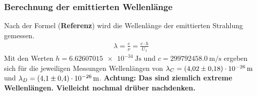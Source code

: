 \subsubsection{Berechnung der emittierten Wellenlänge}
Nach der Formel (\textbf{Referenz}) wird die Wellenlänge der emittierten Strahlung gemessen.
\begin{align}
    \lambda = \frac{c}{\nu} = \frac{c \cdot h}{U_1}
\end{align}
Mit den Werten $h=\qty{6.62607015e-34}{\joule\s}$\cite{scipy} und $c = \qty{299792458.0}{\meter\per\second}$\cite{scipy}
ergeben sich für die jeweiligen Messungen Wellenlängen von $\lambda_C = \qty{ 4.02 +- 0.18 e-26}{\m}$ und $\lambda_D= \qty{4.1 +- 0.4 e-26}{\m}$.
\textbf{Achtung: Das sind ziemlich extreme Wellenlängen. Vielleicht nochmal drüber nachdenken.}